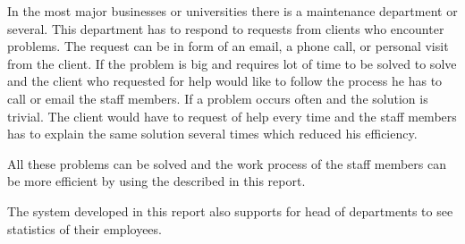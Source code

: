 In the most major businesses or universities there is a maintenance department or several. 
This department has to respond to requests from clients who encounter problems. 
The request can be in form of an email, a phone call, or personal visit from the client. 
If the problem is big and requires lot of time to be solved to solve and the client who requested for help would like to follow the process he has to call or email the staff members. 
If a problem occurs often and the solution is trivial. 
The client would have to request of help every time and the staff members has to explain the same solution several times which reduced his efficiency. 

All these problems can be solved and the work process of the staff members can be more efficient by using the \hdesk[] described in this report. 

The system developed in this report also supports for head of departments to see statistics of their employees.